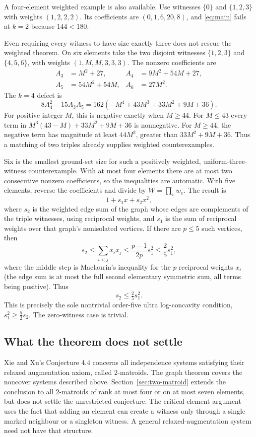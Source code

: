 \documentclass[11pt,a4paper]{article}
\theoremstyle{remark}
\begin{document}
A four-element weighted example is also available. Use witnesses $\{0\}$ and $\{1,2,3\}$ with weights $(1,2,2,2)$. Its coefficients are $(0,1,6,20,8)$, and \eqref{eq:main} fails at $k=2$ because $144<180$.

Even requiring every witness to have size exactly three does not rescue the weighted theorem. On six elements take the two disjoint witnesses $\{1,2,3\}$ and $\{4,5,6\}$, with weights $(1,M,M,3,3,3)$. The nonzero coefficients are
\[
\begin{aligned}
A_3&=M^2+27,& A_4&=9M^2+54M+27,\\
A_5&=54M^2+54M,& A_6&=27M^2.
\end{aligned}
\]
The $k=4$ defect is
\begin{equation}\label{eq:tripledefect}
8A_4^2-15A_3A_5
=162(-M^4+43M^3+33M^2+9M+36).
\end{equation}
For positive integer $M$, this is negative exactly when $M\geq44$. For $M\leq43$ every term in $M^3(43-M)+33M^2+9M+36$ is nonnegative. For $M\geq44$, the negative term has magnitude at least $44M^2$, greater than $33M^2+9M+36$. Thus a matching of two triples already supplies weighted counterexamples.

Six is the smallest ground-set size for such a positively weighted, uniform-three-witness counterexample. With at most four elements there are at most two consecutive nonzero coefficients, so the inequalities are automatic. With five elements, reverse the coefficients and divide by $W=\prod_vw_v$. The result is
\[
1+s_1x+s_2x^2,
\]
where $s_2$ is the weighted edge sum of the graph whose edges are complements of the triple witnesses, using reciprocal weights, and $s_1$ is the sum of reciprocal weights over that graph's nonisolated vertices. If there are $p\leq5$ such vertices, then
\[
s_2\leq\sum_{i<j}x_ix_j
\leq\frac{p-1}{2p}s_1^2\leq\frac25s_1^2,
\]
where the middle step is Maclaurin's inequality for the $p$ reciprocal weights $x_i$ (the edge sum is at most the full second elementary symmetric sum, all terms being positive). Thus
\[
s_2\le\tfrac25s_1^2.
\]
This is precisely the sole nontrivial order-five ultra log-concavity condition, $s_1^2\geq\frac52s_2$. The zero-witness case is trivial.

\subsection{What the theorem does not settle}

Xie and Xu's Conjecture 4.4 concerns all independence systems satisfying their relaxed augmentation axiom, called $2$-matroids. The graph theorem covers the noncover systems described above. Section~\ref{sec:two-matroid} extends the conclusion to all $2$-matroids of rank at most four or on at most seven elements, but does not settle the unrestricted conjecture. The critical-element argument uses the fact that adding an element can create a witness only through a single marked neighbour or a singleton witness. A general relaxed-augmentation system need not have that structure.
\end{document}
